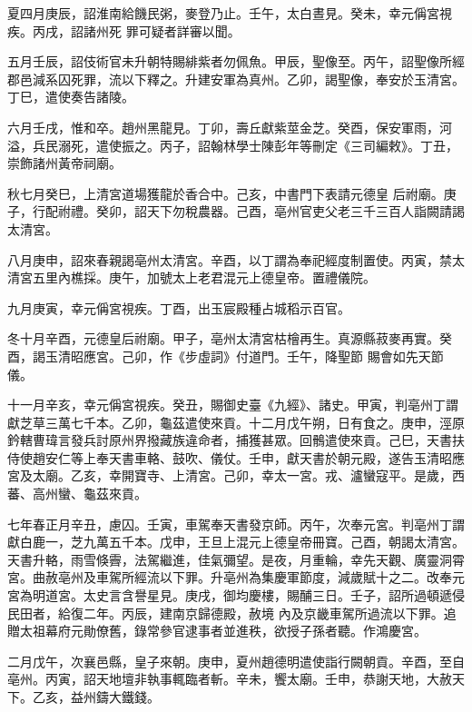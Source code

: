 \begin{pinyinscope}
 夏四月庚辰，詔淮南給饑民粥，麥登乃止。壬午，太白晝見。癸未，幸元偁宮視疾。丙戌，詔諸州死
 罪可疑者詳審以聞。



 五月壬辰，詔伎術官未升朝特賜緋紫者勿佩魚。甲辰，聖像至。丙午，詔聖像所經郡邑減系囚死罪，流以下釋之。升建安軍為真州。乙卯，謁聖像，奉安於玉清宮。丁巳，遣使奏告諸陵。



 六月壬戌，惟和卒。趙州黑龍見。丁卯，壽丘獻紫莖金芝。癸酉，保安軍雨，河溢，兵民溺死，遣使振之。丙子，詔翰林學士陳彭年等刪定《三司編敕》。丁丑，崇飾諸州黃帝祠廟。



 秋七月癸巳，上清宮道場獲龍於香合中。己亥，中書門下表請元德皇
 后祔廟。庚子，行配祔禮。癸卯，詔天下勿稅農器。己酉，亳州官吏父老三千三百人詣闕請謁太清宮。



 八月庚申，詔來春親謁亳州太清宮。辛酉，以丁謂為奉祀經度制置使。丙寅，禁太清宮五里內樵採。庚午，加號太上老君混元上德皇帝。置禮儀院。



 九月庚寅，幸元偁宮視疾。丁酉，出玉宸殿種占城稻示百官。



 冬十月辛酉，元德皇后祔廟。甲子，亳州太清宮枯檜再生。真源縣菽麥再實。癸酉，謁玉清昭應宮。己卯，作《步虛詞》付道門。壬午，降聖節
 賜會如先天節儀。



 十一月辛亥，幸元偁宮視疾。癸丑，賜御史臺《九經》、諸史。甲寅，判亳州丁謂獻芝草三萬七千本。乙卯，龜茲遣使來貢。十二月戊午朔，日有食之。庚申，涇原鈐轄曹瑋言發兵討原州界撥藏族違命者，捕獲甚眾。回鶻遣使來貢。己巳，天書扶侍使趙安仁等上奉天書車輅、鼓吹、儀仗。壬申，獻天書於朝元殿，遂告玉清昭應宮及太廟。乙亥，幸開寶寺、上清宮。己卯，幸太一宮。戎、瀘蠻寇平。是歲，西蕃、高州蠻、龜茲來貢。



 七年春正月辛丑，慮囚。壬寅，車駕奉天書發京師。丙午，次奉元宮。判亳州丁謂獻白鹿一，芝九萬五千本。戊申，王旦上混元上德皇帝冊寶。己酉，朝謁太清宮。天書升輅，雨雪倏霽，法駕繼進，佳氣彌望。是夜，月重輪，幸先天觀、廣靈洞霄宮。曲赦亳州及車駕所經流以下罪。升亳州為集慶軍節度，減歲賦十之二。改奉元宮為明道宮。太史言含譽星見。庚戌，御均慶樓，賜酺三日。壬子，詔所過頓遞侵民田者，給復二年。丙辰，建南京歸德殿，赦境
 內及京畿車駕所過流以下罪。追贈太祖幕府元勛僚舊，錄常參官逮事者並進秩，欲授子孫者聽。作鴻慶宮。



 二月戊午，次襄邑縣，皇子來朝。庚申，夏州趙德明遣使詣行闕朝貢。辛酉，至自亳州。丙寅，詔天地壇非執事輒臨者斬。辛未，饗太廟。壬申，恭謝天地，大赦天下。乙亥，益州鑄大鐵錢。




\end{pinyinscope}
